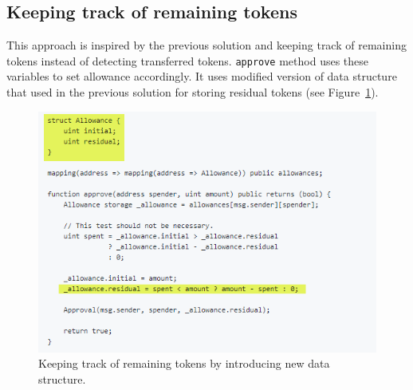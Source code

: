 \subsection{Keeping track of remaining tokens}
This approach\cite{Ref18} is inspired by the previous solution and keeping track of remaining tokens instead of detecting transferred tokens. \texttt{approve} method uses these variables to set allowance accordingly. It uses modified version of data structure that used in the previous solution for storing residual tokens (see Figure~\ref{fig:track}).
\begin{figure}[t]
	\centering
	\includegraphics[width=1.0\linewidth]{figures/multiple_withdrawal_29.png}
	\caption{Keeping track of remaining tokens by introducing new data structure.\label{fig:track}}
\end{figure}

